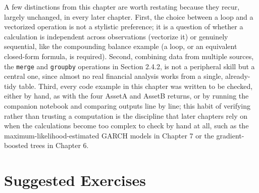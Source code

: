 \documentclass[../ai_in_finance]{subfiles}
\begin{document}
A few distinctions from this chapter are worth restating because they recur, largely unchanged, in every later chapter. First, the choice between a loop and a vectorized operation is not a stylistic preference; it is a question of whether a calculation is independent across observations (vectorize it) or genuinely sequential, like the compounding balance example (a loop, or an equivalent closed-form formula, is required).
Second, combining data from multiple sources, the \texttt{merge} and \texttt{groupby} operations in Section 2.4.2, is not a peripheral skill but a central one, since almost no real financial analysis works from a single, already-tidy table.
Third, every code example in this chapter was written to be checked, either by hand, as with the four AssetA and AssetB returns, or by running the companion notebook and comparing outputs line by line; this habit of verifying rather than trusting a computation is the discipline that later chapters rely on when the calculations become too complex to check by hand at all, such as the maximum-likelihood-estimated GARCH models in Chapter 7 or the gradient-boosted trees in Chapter 6.

\section{Suggested Exercises}
\end{document}
